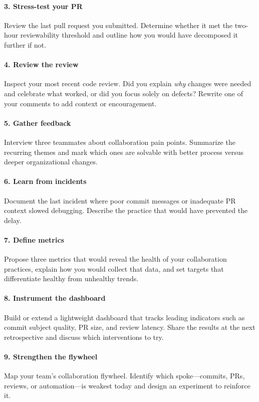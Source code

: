 \paragraph{3. Stress-test your PR} Review the last pull request you submitted. Determine whether it met the two-hour reviewability threshold and outline how you would have decomposed it further if not.

\paragraph{4. Review the review} Inspect your most recent code review. Did you explain \textit{why} changes were needed and celebrate what worked, or did you focus solely on defects? Rewrite one of your comments to add context or encouragement.

\paragraph{5. Gather feedback} Interview three teammates about collaboration pain points. Summarize the recurring themes and mark which ones are solvable with better process versus deeper organizational changes.

\paragraph{6. Learn from incidents} Document the last incident where poor commit messages or inadequate PR context slowed debugging. Describe the practice that would have prevented the delay.

\paragraph{7. Define metrics} Propose three metrics that would reveal the health of your collaboration practices, explain how you would collect that data, and set targets that differentiate healthy from unhealthy trends.

\paragraph{8. Instrument the dashboard} Build or extend a lightweight dashboard that tracks leading indicators such as commit subject quality, PR size, and review latency. Share the results at the next retrospective and discuss which interventions to try.

\paragraph{9. Strengthen the flywheel} Map your team's collaboration flywheel. Identify which spoke---commits, PRs, reviews, or automation---is weakest today and design an experiment to reinforce it.

